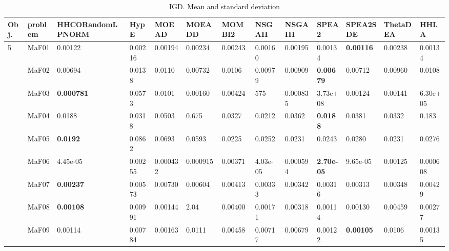 \documentclass[]{article}
\begin{document}
\begin{landscape}
\begin{table}
\caption{IGD. Mean and standard deviation}
\label{table:mean.IGD}
\centering
\begin{footnotesize}
\begin{tabular}{|l|l|l|l|l|l|l|l|l|l|l|l|l|}
\hline
Obj. & problem  & HHCORandomLPNORM & HypE & MOEAD & MOEADD & MOMBI2 & NSGAII & NSGAIII & SPEA2 & SPEA2SDE & ThetaDEA & HHLA \\ \hline

\multirow{15}{*}{5} & MaF01 & \cellcolor{gray95} 0.00122 & 0.00216 & 0.00194 & 0.00234 & 0.00243 & 0.00160 & 0.00195 & \cellcolor{gray95} 0.00134 & \cellcolor{gray95} {\bf 0.00116} & 0.00238 & \cellcolor{gray95} 0.00134\\
 & MaF02 & \cellcolor{gray95} 0.00694 & 0.0138 & 0.0110 & \cellcolor{gray95} 0.00732 & 0.0106 & 0.00979 & 0.00909 & \cellcolor{gray95} {\bf 0.00679} & \cellcolor{gray95} 0.00712 & 0.00960 & 0.0108\\
 & MaF03 & \cellcolor{gray95} {\bf 0.000781} & 0.0573 & 0.0101 & 0.00160 & 0.00424 & 575 & \cellcolor{gray95} 0.000835 & 3.73e+08 & \cellcolor{gray95} 0.00124 & \cellcolor{gray95} 0.00141 & 6.30e+05\\
 & MaF04 & \cellcolor{gray95} 0.0188 & 0.0318 & 0.0503 & 0.675 & 0.0327 & \cellcolor{gray95} 0.0212 & 0.0362 & \cellcolor{gray95} {\bf 0.0188} & 0.0381 & 0.0332 & 0.183\\
 & MaF05 & \cellcolor{gray95} {\bf 0.0192} & 0.0862 & 0.0693 & 0.0593 & \cellcolor{gray95} 0.0225 & 0.0252 & 0.0231 & \cellcolor{gray95} 0.0243 & 0.0280 & 0.0231 & 0.0276\\
 & MaF06 & \cellcolor{gray95} 4.45e-05 & 0.00255 & 0.000432 & 0.000915 & 0.00371 & \cellcolor{gray95} 4.03e-05 & 0.000594 & \cellcolor{gray95} {\bf 2.70e-05} & \cellcolor{gray95} 9.65e-05 & 0.00125 & 0.000608\\
 & MaF07 & \cellcolor{gray95} {\bf 0.00237} & 0.00573 & 0.00730 & 0.00604 & 0.00413 & 0.00333 & 0.00342 & \cellcolor{gray95} 0.00316 & \cellcolor{gray95} 0.00313 & 0.00348 & 0.00429\\
 & MaF08 & \cellcolor{gray95} {\bf 0.00108} & 0.00991 & \cellcolor{gray95} 0.00144 & 2.04 & 0.00400 & 0.00171 & 0.00318 & \cellcolor{gray95} 0.00114 & \cellcolor{gray95} 0.00130 & 0.00459 & 0.00277\\
 & MaF09 & \cellcolor{gray95} 0.00114 & 0.00784 & 0.00163 & 0.0111 & 0.00458 & 0.00717 & 0.00679 & \cellcolor{gray95} 0.00122 & \cellcolor{gray95} {\bf 0.00105} & 0.0106 & \cellcolor{gray95} 0.00135\\

\end{tabular}
\end{footnotesize}
\end{table}
\end{landscape}
\end{document}
